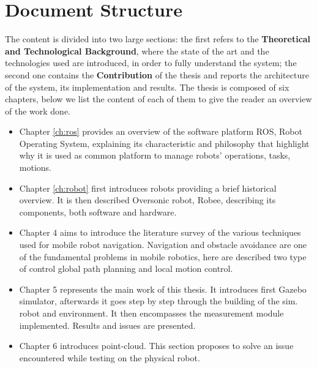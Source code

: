 \section{Document Structure}
The content is divided into two large sections: the first refers to the \textbf{Theoretical and Technological Background}, where the state of the art and the technologies used are introduced, in order to fully understand the system; the second one contains the \textbf{Contribution} of the thesis and
reports the architecture of the system, its implementation and results.
The thesis is composed of six chapters, below we list the content of each of them to give
the reader an overview of the work done.\\
\newline
\begin{itemize}
    \item Chapter \ref{ch:ros} provides an overview of the software platform ROS, Robot Operating
System, explaining its characteristic and philosophy that highlight why it is used as
common platform to manage robots’ operations, tasks, motions.
    \item Chapter \ref{ch:robot} first introduces robots providing a brief historical overview. It is then described Oversonic robot, Robee, describing its components, both software and hardware.
    \item Chapter 4 aims to introduce the literature survey of the various techniques used for
mobile robot navigation. Navigation and obstacle avoidance are one of the
fundamental problems in mobile robotics, here are described two type of control global
path planning and local motion control.
    \item Chapter 5 represents the main work of this thesis. It introduces first Gazebo simulator, afterwards it goes step by step through the building of the sim. robot and environment. It then encompasses the measurement module implemented. Results and issues are presented.
    \item Chapter 6 introduces point-cloud. This section proposes to solve an issue encountered while testing on the physical robot. 
\end{itemize}    






